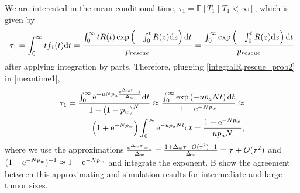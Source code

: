 \documentclass[12pt]{extarticle}
\renewcommand{\d}[1]{\ensuremath{\operatorname{d}\!{#1}}}
\renewcommand{\d}{{\rm d}}
\newcommand{\e}{{\rm e}}
\begin{document}
We are interested in the mean conditional time, $\tau_1=\mathbb{E}\left[T_1 \mid T_1<\infty\right]$, which is given by
\begin{equation}\label{meantime1}
\begin{aligned}
\tau_1 =
\int_{0}^{\infty}{t f_1(t) \d t} = 
\frac{\int_{0}^{\infty}{tR(t)\exp\left(-\int_0^{t}{R(z)\d z}\right) \d t}}{p_{rescue}} = 
\frac{\int_{0}^{\infty}{\exp\left(-\int_0^{t}{R(z)\d z}\right) \d t}}{p_{rescue}}
\end{aligned}
\end{equation}
after applying integration by parts.
Therefore, plugging \cref{integralR,rescue_prob2} in \cref{meantime1}, 
\begin{align}\label{limitapprox}
\tau_1 = 
\frac{\int_0^\infty\e^{-uNp_a\frac{\e^{\Delta_w t}-1}{\Delta_w}} \d t}{1-\left(1-p_w\right)^N} \approx
\frac{\int_{0}^{\infty}{\exp\left(-u p_a N t\right) \d t}}{1-\e^{-Np_w}} \approx \\
\left(1+\e^{-Np_w}\right)\int_0^\infty\e^{-u p_a N t} \d t =
\frac{1+\e^{-Np_w}}{u p_a N} ,
\end{align}
where we use the approximations 
$\frac{\e^{\Delta_w\tau}-1}{\Delta_w}=\frac{1+\Delta_w\tau+O(\tau^2)-1}{\Delta_w}=\tau+O(\tau^2)$ and $(1-\e^{-Np_w})^{-1} \approx 1+\e^{-Np_w}$ and integrate the exponent.
B show the agreement between this approximating and simulation results for intermediate and large tumor sizes.
\\
\end{document}
